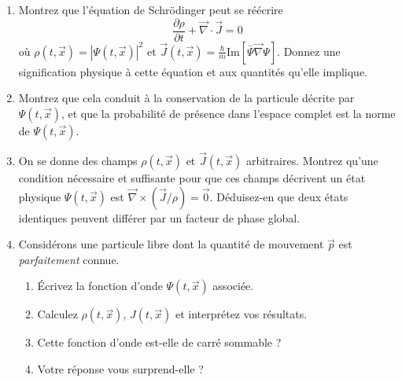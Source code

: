 \begin{enumerate}
	\item Montrez que l'équation de Schrödinger peut se réécrire
	\begin{equation}
	\frac{\partial\rho}{\partial t} + \vec\nabla\cdot\vec J = 0
	\end{equation}
	où $\rho(t,\vec x) = |\Psi(t,\vec x)|^2$ et $\vec J(t,\vec x) = \frac{\hbar}{m} \text{Im}[\bar\Psi \vec \nabla \Psi]$. Donnez une signification physique à cette équation et aux quantités qu'elle implique. 
	\item Montrez que cela conduit à la conservation de la particule décrite par $\Psi(t,\vec x)$, et que la probabilité de présence dans l'espace complet est la norme de $\Psi(t,\vec x)$.
	\item On se donne des champs $\rho(t,\vec x)$ et $\vec J(t,\vec x)$ arbitraires. Montrez qu'une condition nécessaire et suffisante pour que ces champs décrivent un état physique $\Psi(t,\vec x)$ est $\vec\nabla\times (\vec J/\rho) = \vec 0$. Déduisez-en que deux états identiques peuvent différer par un facteur de phase global.
	\item Considérons une particule libre dont la quantité de mouvement $\vec p$ est \textit{parfaitement} connue. 
	\begin{enumerate}
	\item Écrivez la fonction d'onde $\Psi(t,\vec x)$ associée. 
	\item Calculez $\rho(t,\vec x)$, $J(t,\vec x)$ et interprétez vos résultats.
	\item Cette fonction d'onde est-elle de carré sommable ?
	\item Votre réponse vous surprend-elle ?
	\end{enumerate}
\end{enumerate}

